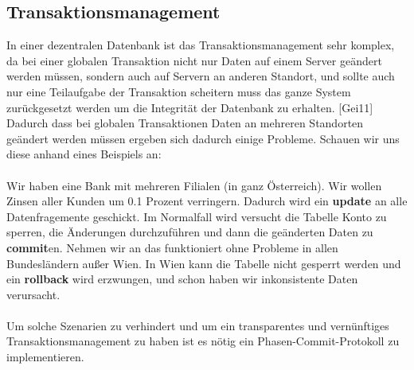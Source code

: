 \documentclass[letterpaper, 12pt]{article}
\let\tempsubsection\subsection
\renewcommand\subsection[1]{\vspace{0cm}\tempsubsection{#1}\vspace{0cm}}
\begin{document}
\subsection{Transaktionsmanagement}
In einer dezentralen Datenbank ist das Transaktionsmanagement sehr komplex, da bei einer globalen Transaktion nicht nur Daten auf einem Server geändert werden müssen, sondern auch auf Servern an anderen Standort, und sollte auch nur eine Teilaufgabe der Transaktion scheitern muss das ganze System zurückgesetzt werden um die Integrität der Datenbank zu erhalten. [Gei11]\\
Dadurch dass bei globalen Transaktionen Daten an mehreren Standorten geändert werden müssen ergeben sich dadurch einige Probleme. Schauen wir uns diese anhand eines Beispiels an:\\\\
Wir haben eine Bank mit mehreren Filialen (in ganz Österreich). Wir wollen Zinsen aller Kunden um 0.1 Prozent verringern. Dadurch wird ein \textbf{update} an alle Datenfragemente geschickt. Im Normalfall wird versucht die Tabelle Konto zu sperren, die Änderungen durchzuführen und dann die geänderten Daten zu \textbf{commit}en. Nehmen wir an das funktioniert ohne Probleme in allen Bundesländern außer Wien. In Wien kann die Tabelle nicht gesperrt werden und ein \textbf{rollback} wird erzwungen, und schon haben wir inkonsistente Daten verursacht.\\\\
Um solche Szenarien zu verhindert und um ein transparentes und vernünftiges Transaktionsmanagement zu haben ist es nötig ein Phasen-Commit-Protokoll zu implementieren.
\end{document}
